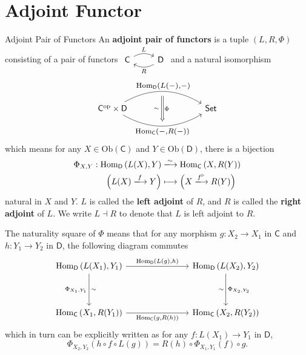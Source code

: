 \section{Adjoint Functor}
\begin{definition}{Adjoint Pair of Functors}{}
    An \textbf{adjoint pair of functors} is a tuple $\left(L,R,\Phi\right)$ consisting of a pair of functors $\begin{tikzcd}[ampersand replacement=\&]
        \mathsf{C} \arrow[r, "L", bend left] \& \mathsf{D} \arrow[l, "R", bend left]
        \end{tikzcd}$
    and a natural isomorphism 
    \[
            \begin{tikzcd}[ampersand replacement=\&]
                \mathsf{C}^{\mathrm{op}}\times\mathsf{D} \arrow[r, "\scalebox{1.2}{$\mathrm{Hom}_{\mathsf{D}}\left(L(-){,}-\right)$}"{name=A, above}, bend left] \arrow[r, "\scalebox{1.2}{$\mathrm{Hom}_{\mathsf{C}}\left(-{,}R(-)\right)$}"'{name=B, below}, bend right] \&[+60pt] \mathsf{Set}
                \arrow[Rightarrow, shorten <=5.5pt, shorten >=5.5pt, from=A.south-|B, to=B, "\Phi", "\sim\hspace{1.5pt}"']
            \end{tikzcd}
    \]
    which means for any $X\in \mathrm{Ob}(\mathsf{C})$ and $Y\in \mathrm{Ob}(\mathsf{D})$, there is a bijection
    \begin{align*}
        \Phi_{X,Y}:\mathrm{Hom}_{\mathsf{D}}\left(L(X),Y\right)&\xlongrightarrow{\sim} \mathrm{Hom}_{\mathsf{C}}\left(X,R(Y)\right)\\
        \Big(L(X)\xlongrightarrow{f}Y\Big)&\longmapsto \Big(X\xlongrightarrow{f^{\triangleright}}R(Y)\Big)
    \end{align*}
    natural in $X$ and $Y$. $L$ is called the \textbf{left adjoint} of $R$, and $R$ is called the \textbf{right adjoint} of $L$. We write $L\dashv R$ to denote that $L$ is left adjoint to $R$.
\end{definition}

The naturality square of $\Phi$ means that for any morphism $g:X_2\to X_1$ in $\mathsf{C}$ and $h:Y_1\to Y_2$ in $\mathsf{D}$, the following diagram commutes
\[
    \begin{tikzcd}[ampersand replacement=\&]
        \mathrm{Hom}_{\mathsf{D}}\left(L(X_1),Y_1\right) \arrow[r, "{\mathrm{Hom}_{\mathsf{D}}\left(L(g){,}h\right)}"] \arrow[d, "\Phi_{X_1,Y_1}"', "\sim"] \&[+50pt] \mathrm{Hom}_{\mathsf{D}}\left(L(X_2),Y_2\right) \arrow[d, "\Phi_{X_2,Y_2}", "\sim"'] \\[+20pt]
        \mathrm{Hom}_{\mathsf{C}}\left(X_1,R(Y_1)\right) \arrow[r, "{\mathrm{Hom}_{\mathsf{C}}\left(g{,}R(h)\right)}"'] \& \mathrm{Hom}_{\mathsf{C}}\left(X_2,R(Y_2)\right)
    \end{tikzcd}
\]
which in turn can be explicitly written as for any $f:L(X_1)\to Y_1$ in $\mathsf{D}$,
\[
    \Phi_{X_2,Y_2}\left(h\circ f\circ L(g)\right)=R(h)\circ\Phi_{X_1,Y_1}(f)\circ g.
\]

